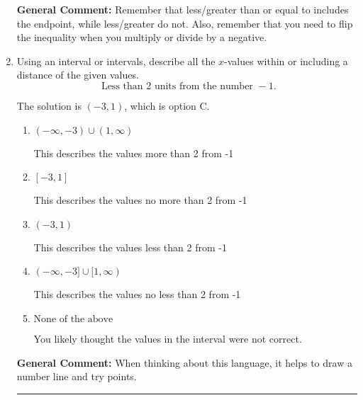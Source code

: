\documentclass{extbook}[14pt]
\newcommand{\litem}[1]{\item #1

\rule{\textwidth}{0.4pt}}
\begin{document}
\begin{enumerate}
{\textbf{General Comment:} Remember that less/greater than or equal to includes the endpoint, while less/greater do not. Also, remember that you need to flip the inequality when you multiply or divide by a negative.
}
\litem{
Using an interval or intervals, describe all the $x$-values within or including a distance of the given values.
\[ \text{ Less than } 2 \text{ units from the number } -1. \]

The solution is \( (-3, 1) \), which is option C.\begin{enumerate}[label=\Alph*.]
\item \( (-\infty, -3) \cup (1, \infty) \)

This describes the values more than 2 from -1
\item \( [-3, 1] \)

This describes the values no more than 2 from -1
\item \( (-3, 1) \)

This describes the values less than 2 from -1
\item \( (-\infty, -3] \cup [1, \infty) \)

This describes the values no less than 2 from -1
\item \( \text{None of the above} \)

You likely thought the values in the interval were not correct.
\end{enumerate}

\textbf{General Comment:} When thinking about this language, it helps to draw a number line and try points.
}
\end{enumerate}
\end{document}

